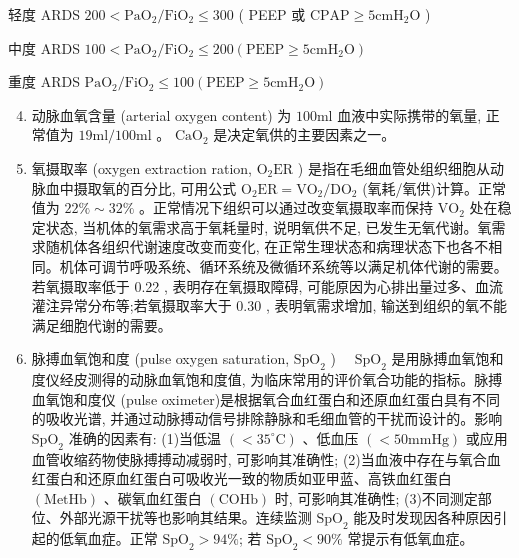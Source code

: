 \documentclass[10pt]{article}
\begin{document}
轻度 ARDS $200<\mathrm{PaO}_{2} / \mathrm{FiO}_{2} \leqslant 300$ ( PEEP 或 $\mathrm{CPAP} \geqslant 5 \mathrm{cmH}_{2} \mathrm{O}$ )

中度 ARDS $100<\mathrm{PaO}_{2} / \mathrm{FiO}_{2} \leqslant 200\left(\mathrm{PEEP} \geqslant 5 \mathrm{cmH}_{2} \mathrm{O}\right)$

重度 ARDS $\mathrm{PaO}_{2} / \mathrm{FiO}_{2} \leqslant 100\left(\mathrm{PEEP} \geqslant 5 \mathrm{cmH}_{2} \mathrm{O}\right)$

\begin{enumerate}
  \setcounter{enumi}{3}
  \item 动脉血氧含量 (arterial oxygen content) 为 $100 \mathrm{ml}$ 血液中实际携带的氧量, 正常值为 $19 \mathrm{ml} / 100 \mathrm{ml}$ 。 $\mathrm{CaO}_{2}$ 是决定氧供的主要因素之一。

  \item 氧摄取率 (oxygen extraction ration, $\mathrm{O}_{2} \mathrm{ER}$ ) 是指在毛细血管处组织细胞从动脉血中摄取氧的百分比, 可用公式 $\mathrm{O}_{2} \mathrm{ER}=\mathrm{VO}_{2} / \mathrm{DO}_{2}$ (氧耗/氧供)计算。正常值为 $22 \% \sim 32 \%$ 。正常情况下组织可以通过改变氧摄取率而保持 $\mathrm{VO}_{2}$ 处在稳定状态, 当机体的氧需求高于氧耗量时, 说明氧供不足, 已发生无氧代谢。氧需求随机体各组织代谢速度改变而变化, 在正常生理状态和病理状态下也各不相同。机体可调节呼吸系统、循环系统及微循环系统等以满足机体代谢的需要。若氧摄取率低于 0.22 , 表明存在氧摄取障碍, 可能原因为心排出量过多、血流灌注异常分布等;若氧摄取率大于 0.30 , 表明氧需求增加, 输送到组织的氧不能满足细胞代谢的需要。

  \item 脉搏血氧饱和度 (pulse oxygen saturation, $\mathrm{SpO}_{2}$ ) $\quad \mathrm{SpO}_{2}$ 是用脉搏血氧饱和度仪经皮测得的动脉血氧饱和度值, 为临床常用的评价氧合功能的指标。脉搏血氧饱和度仪 (pulse oximeter)是根据氧合血红蛋白和还原血红蛋白具有不同的吸收光谱, 并通过动脉搏动信号排除静脉和毛细血管的干扰而设计的。影响 $\mathrm{SpO}_{2}$ 准确的因素有: (1)当低温 $\left(<35^{\circ} \mathrm{C}\right)$ 、低血压 $(<50 \mathrm{mmHg})$ 或应用血管收缩药物使脉搏搏动减弱时, 可影响其准确性; (2)当血液中存在与氧合血红蛋白和还原血红蛋白可吸收光一致的物质如亚甲蓝、高铁血红蛋白 $(\mathrm{MetHb})$ 、碳氧血红蛋白 $(\mathrm{COHb})$ 时, 可影响其准确性; (3)不同测定部位、外部光源干扰等也影响其结果。连续监测 $\mathrm{SpO}_{2}$ 能及时发现因各种原因引起的低氧血症。正常 $\mathrm{SpO}_{2}>94 \%$; 若 $\mathrm{SpO}_{2}<90 \%$ 常提示有低氧血症。


\end{enumerate}
\end{document}
